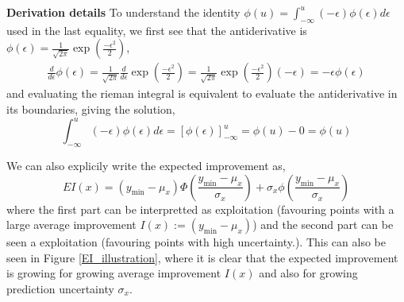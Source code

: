 \begin{note}
    \textbf{Derivation details}
    To understand the identity $\phi(u) = \int_{-\infty}^u
    (-\epsilon)  \phi(\epsilon) d\epsilon$ used in the last equality, we first see that the antiderivative
is $\phi(\epsilon) = \frac{1}{\sqrt{2\pi}} \exp\left(\frac{-\epsilon^2}{2}\right)$,
\begin{align*}
    \frac{d}{d \epsilon} \phi(\epsilon) =  \frac{1}{\sqrt{2\pi}}\frac{d}{d \epsilon}  \exp\left(\frac{-\epsilon^2}{2}\right) 
    =  \frac{1}{\sqrt{2\pi}}\exp\left(\frac{-\epsilon^2}{2}\right)(-\epsilon)
    = -\epsilon \phi(\epsilon)
\end{align*}
and evaluating the rieman integral is equivalent to evaluate the antiderivative in its boundaries, giving the 
solution, 
$$\int_{-\infty}^u
(-\epsilon)  \phi(\epsilon) d\epsilon = \left[\phi(\epsilon)\right]_{-\infty}^u = \phi(u)-0 = \phi(u)$$ 
\end{note}

We can also explicily write the expected improvement as, 
$$EI(x) = (y_{\min}-\mu_x)\Phi\left(\frac{y_{\min}-\mu_x}{\sigma_x}\right)+ \sigma_x
\phi\left(\frac{y_{\min}-\mu_x}{\sigma_x}\right)$$ where the first part can be interpretted as
exploitation (favouring points with a large average improvement $I(x) := (y_{\min}-\mu_x)$) and the second
part can be seen a exploitation (favouring points with high uncertainty.). This can also be seen
in Figure \eqref{EI_illustration}, where it is clear that the expected improvement is growing for
growing average improvement $I(x)$ and also for growing prediction uncertainty $\sigma_x$.


